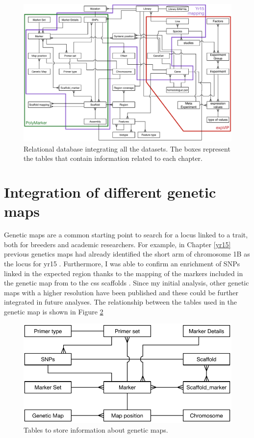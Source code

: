 \begin{figure}
\includegraphics[width=1\textwidth]{Conclusions/Figures/CompleteDatabase.pdf}
\caption[Relational database integrating all the datasets.]{Relational database integrating all the datasets. The boxes represent the tables that contain information related to each chapter.}
\label{fig:discussion:allTables}
\end{figure}

\newpage
\section{Integration of different genetic maps}

Genetic maps are a common starting point to search for a locus linked to a trait, both for breeders and academic researchers. 
For example, in Chapter \ref{yr15} previous genetics maps had already identified the short arm of chromosome 1B as the locus for \acrshort{yr15} \citep{Murphy2009}.
Furthermore, I was able to confirm an enrichment of SNPs linked in the expected region thanks to the mapping of the markers included in the genetic map from \citet{Wang2014} to the \acrshort{css} scaffolds \citep{Mayer2014}. Since my initial analysis, other genetic maps with a higher resolution have been published \citep{Chapman2015, Allen2016,Winfield2016} and these could be further integrated in future analyses. 
The relationship between the tables used in the genetic map is shown in Figure \ref{fig:discussion:geneticMapsTables}

\begin{figure}[b]
\includegraphics[width=1\textwidth]{Conclusions/Figures/GenetiMapTables.pdf}
\caption{Tables to store information about genetic maps.}
\label{fig:discussion:geneticMapsTables}
\end{figure}

